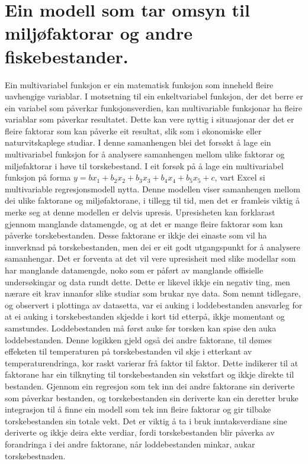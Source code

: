 \documentclass{report}
\begin{document}
\section{Ein modell som tar omsyn til miljøfaktorar og andre fiskebestander.}
Ein multivariabel funksjon er ein matematisk funksjon som inneheld fleire uavhengige variablar. I motsetning til ein enkeltvariabel funksjon, der det berre er ein variabel som påverkar funksjonsverdien, kan multivariable funksjonar ha fleire variablar som påverkar resultatet. Dette kan vere nyttig i situasjonar der det er fleire faktorar som kan påverke eit resultat, slik som i økonomiske eller naturvitskaplege studiar.
I denne samanhengen blei det forsøkt å lage ein multivariabel funksjon for å analysere samanhengen mellom ulike faktorar og miljøfaktorar i høve til torskebestand.
I eit forsøk på å lage ein multivariabel funksjon på forma $y=bx_1 +b_2x_2 +b_3x_3 +b_4x_4+b_5x_5+c$, vart Excel si multivariable regresjonsmodell nytta.
Denne modellen viser samanhengen mellom dei ulike faktorane og miljøfaktorane, i tillegg til tid, men det er framleis viktig å merke seg at denne modellen er delvis upresis.
Upresisheten kan forklarast gjennom manglande datamengde, og at det er mange fleire faktorar som kan påverke torskebestanden.
Desse faktorane er ikkje dei einaste som vil ha innverknad på torskebestanden, men dei er eit godt utgangspunkt for å analysere samanhengar. Det er forventa at det vil vere upresisheit med slike modellar som har manglande datamengde, noko som er påført av manglande offisielle undersøkingar og data rundt dette. Dette er likevel ikkje ein negativ ting, men nærare eit krav innanfor slike studiar som brukar nye data.
Som nemnt tidlegare, og observert i plottinga av datasetta, var ei auking i loddebestanden ansvarleg for at ei auking i torskebestanden skjedde i kort tid etterpå, ikkje momentant og samstundes.
Loddebestanden må først auke før torsken kan spise den auka loddebestanden. Denne logikken gjeld også dei andre faktorane, til dømes effeketen til temperaturen på torskebestanden vil skje i etterkant av temperaturendringa, kor raskt varierar frå faktor til faktor.
Dette indikerer til at faktorane har ein tilknyting til torskebestanden sin vekstfart og ikkje direkte til bestanden. 
Gjennom ein regresjon som tek inn dei andre faktorane sin deriverte som påverkar bestanden, og torskebestanden sin deriverte kan ein deretter bruke integrasjon til å finne ein modell som tek inn fleire faktorar og gir tilbake torskebestanden sin totale vekt.
Det er viktig å ta i bruk inntaksverdiane sine deriverte og ikkje deira ekte verdiar, fordi torskebestanden blir påverka av forandringa i dei andre faktorane, når loddebestanden minkar, aukar torskebestnaden.
\end{document}
